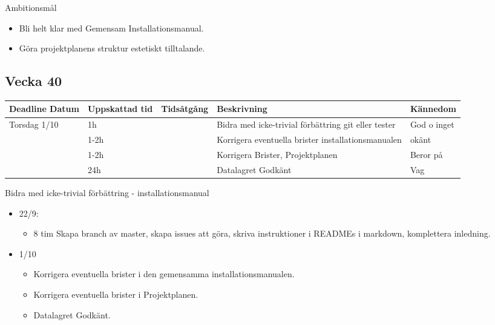 \documentclass{TDP003mall}
\begin{document}
      Ambitionsmål
\begin{itemize}
\item Bli helt klar med Gemensam Installationsmanual.
  \item Göra projektplanens struktur estetiskt tilltalande.
  \end{itemize}

\subsection{Vecka 40}
\begin{tabularx}{\linewidth}{|l|l|l|X|l|}
	\hline
	Deadline Datum & Uppskattad tid & Tidsåtgång & Beskrivning                                         & Kännedom    \\ [0.5ex]
	\hline
	Torsdag 1/10   & 1h             &            & Bidra med icke-trivial förbättring git eller tester & God o inget \\
	\hline
                   & 1-2h           &            & Korrigera eventuella brister installationsmanualen  & okänt       \\
	\hline
                   & 1-2h           &            & Korrigera Brister, Projektplanen                    & Beror på    \\
	\hline
                   & 24h            &            & Datalagret Godkänt                                  & Vag         \\
	\hline
\end{tabularx}

Bidra med icke-trivial förbättring - installationsmanual
\begin{itemize}
\item 22/9:
  \begin{itemize}
  \item 8 tim Skapa branch av master, skapa issues att göra, skriva instruktioner i READMEs i markdown, komplettera inledning.\\
  \end{itemize}
\item 1/10
  \begin{itemize}
  \item Korrigera eventuella brister i den gemensamma installationsmanualen.\\
  \item Korrigera eventuella brister i Projektplanen.\\
  \item  Datalagret Godkänt.\\    
  \end{itemize}
\end{itemize}
\end{document}
